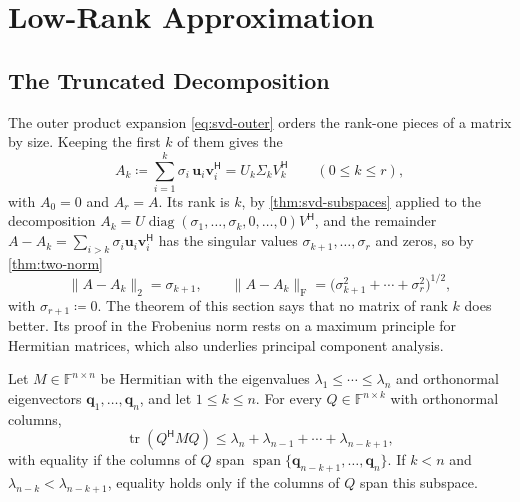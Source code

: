 \section{Low-Rank Approximation}
\label{sec:low-rank}

\subsection{The Truncated Decomposition}

The outer product expansion \eqref{eq:svd-outer} orders the rank-one pieces of a matrix by size. Keeping the first $k$ of them gives the 
\[
A_k\coloneqq\sum_{i=1}^k\sigma_i\,\mathbf u_i\mathbf v_i^{\mathsf H}=U_k\Sigma_kV_k^{\mathsf H}\qquad(0\le k\le r),
\]
with $A_0=0$ and $A_r=A$. Its rank is $k$, by \cref{thm:svd-subspaces} applied to the decomposition $A_k=U\operatorname{diag}(\sigma_1,\ldots,\sigma_k,0,\ldots,0)V^{\mathsf H}$, and the remainder $A-A_k=\sum_{i>k}\sigma_i\mathbf u_i\mathbf v_i^{\mathsf H}$ has the singular values $\sigma_{k+1},\ldots,\sigma_r$ and zeros, so by \cref{thm:two-norm}
\begin{equation}
\|A-A_k\|_2=\sigma_{k+1},\qquad\|A-A_k\|_{\mathrm F}=\bigl(\sigma_{k+1}^2+\cdots+\sigma_r^2\bigr)^{1/2},
\label{eq:truncation-error}
\end{equation}
with $\sigma_{r+1}\coloneqq0$. The theorem of this section says that no matrix of rank $k$ does better. Its proof in the Frobenius norm rests on a maximum principle for Hermitian matrices, which also underlies principal component analysis.

\begin{lemma}
\label{lem:ky-fan}
Let $M\in\mathbb F^{n\times n}$ be Hermitian with the eigenvalues $\lambda_1\le\cdots\le\lambda_n$ and orthonormal eigenvectors $\mathbf q_1,\ldots,\mathbf q_n$, and let $1\le k\le n$. For every $Q\in\mathbb F^{n\times k}$ with orthonormal columns,
\[
\operatorname{tr}(Q^{\mathsf H}MQ)\le\lambda_n+\lambda_{n-1}+\cdots+\lambda_{n-k+1},
\]
with equality if the columns of $Q$ span $\operatorname{span}\{\mathbf q_{n-k+1},\ldots,\mathbf q_n\}$. If $k<n$ and $\lambda_{n-k}<\lambda_{n-k+1}$, equality holds only if the columns of $Q$ span this subspace.
\end{lemma}

